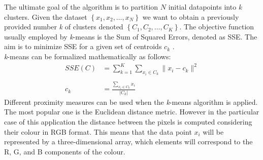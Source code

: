 \documentclass{usiinftr}
\begin{document}
\newpage
\noindent
The ultimate goal of the algorithm is to partition $N$ initial datapoints into \textit{k} clusters. Given the dataset $\left\lbrace x_1, x_2, \dots, x_N \right\rbrace$ we want to obtain a previously provided number \textit{k} of clusters denoted $\left\lbrace C_1, C_2, \dots, C_K \right\rbrace $. The objective function usually employed by \textit{k}-means is the Sum of Squared Errors, denoted as SSE. The aim  is to minimize SSE for a given set of centroids $c_k$ \cite{11}. \\
\textit{k}-means can be  formalized mathematically as follows: 
\begin{equation*}
\begin{split}
SSE(C) &= \sum_{k=1}^{K} \sum_{x_i \in C_k} \| x_i - c_k\|^2 \\ \\
c_k &= \frac{\sum\limits_{x_i \in C_k} x_i}{|C_k|}
\end{split}
\end{equation*}
Different proximity measures can be used when the \textit{k}-means algorithm is applied. The most popular one is the Euclidean distance metric. 
However in the particular case of this application the distance between the pixels is computed considering their colour in RGB format. This means that the data point $x_i$ will be represented by a three-dimensional array, which elements will correspond to the R, G, and B components of the colour. 
\end{document}
